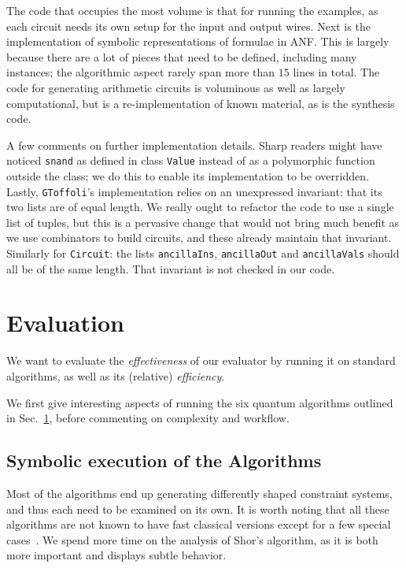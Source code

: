 \documentclass[sigplan,screen]{acmart}
\theoremstyle{definition}
\begin{document}
The code that occupies the most volume is that for running the examples, as each
circuit needs its own setup for the input and output wires. Next is the implementation
of symbolic representations of formulae in ANF. This is largely because there are a
lot of pieces that need to be defined, including many instances; the algorithmic aspect
rarely span more than $15$ lines in total. The code for generating arithmetic circuits
is voluminous as well as largely computational, but is a re-implementation of known
material, as is the synthesis code.

A few comments on further implementation details. Sharp readers might have noticed
\texttt{snand} as defined in class \texttt{Value} instead of as a polymorphic function
outside the class; we do this to enable its implementation to be overridden.
Lastly, \texttt{GToffoli}'s implementation relies on an unexpressed invariant: that its
two lists are of equal length. We really ought to refactor the code to use a single
list of tuples, but this is a pervasive change that would not bring much benefit as
we use combinators to build circuits, and these already maintain that invariant.
Similarly for \texttt{Circuit}: the lists \texttt{ancillaIns}, \texttt{ancillaOut}
and \texttt{ancillaVals} should all be of the same length. That invariant is not
checked in our code.

\section{Evaluation}
\label{sec5}

We want to evaluate the \emph{effectiveness} of our evaluator by running it
on standard algorithms, as well as its (relative) \emph{efficiency}.

We first give interesting aspects of running the six quantum algorithms
outlined in Sec.~\ref{sec5}, before commenting on complexity and workflow.

\subsection{Symbolic execution of the Algorithms}

Most of the algorithms end up generating differently shaped constraint
systems, and thus each need to be examined on its own. It is worth
noting that all these algorithms are not known to have fast classical
versions except for a few special cases~\cite{calude,djdeq}. We spend more
time on the analysis of Shor's algorithm, as it is both more important
and displays subtle behavior.
\end{document}
